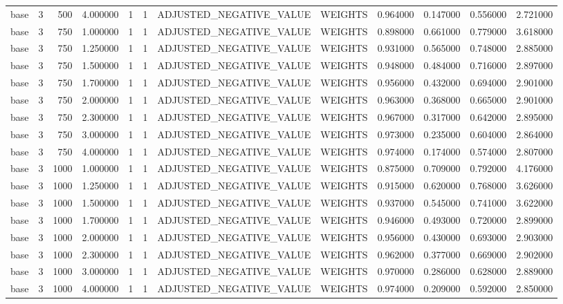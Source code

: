 \begin{tabular}{lrrrllllrrrr}
base & 3 & 500 & 4.000000 & 1 & 1 & ADJUSTED_NEGATIVE_VALUE & WEIGHTS & 0.964000 & 0.147000 & 0.556000 & 2.721000 \\
base & 3 & 750 & 1.000000 & 1 & 1 & ADJUSTED_NEGATIVE_VALUE & WEIGHTS & 0.898000 & 0.661000 & 0.779000 & 3.618000 \\
base & 3 & 750 & 1.250000 & 1 & 1 & ADJUSTED_NEGATIVE_VALUE & WEIGHTS & 0.931000 & 0.565000 & 0.748000 & 2.885000 \\
base & 3 & 750 & 1.500000 & 1 & 1 & ADJUSTED_NEGATIVE_VALUE & WEIGHTS & 0.948000 & 0.484000 & 0.716000 & 2.897000 \\
base & 3 & 750 & 1.700000 & 1 & 1 & ADJUSTED_NEGATIVE_VALUE & WEIGHTS & 0.956000 & 0.432000 & 0.694000 & 2.901000 \\
base & 3 & 750 & 2.000000 & 1 & 1 & ADJUSTED_NEGATIVE_VALUE & WEIGHTS & 0.963000 & 0.368000 & 0.665000 & 2.901000 \\
base & 3 & 750 & 2.300000 & 1 & 1 & ADJUSTED_NEGATIVE_VALUE & WEIGHTS & 0.967000 & 0.317000 & 0.642000 & 2.895000 \\
base & 3 & 750 & 3.000000 & 1 & 1 & ADJUSTED_NEGATIVE_VALUE & WEIGHTS & 0.973000 & 0.235000 & 0.604000 & 2.864000 \\
base & 3 & 750 & 4.000000 & 1 & 1 & ADJUSTED_NEGATIVE_VALUE & WEIGHTS & 0.974000 & 0.174000 & 0.574000 & 2.807000 \\
base & 3 & 1000 & 1.000000 & 1 & 1 & ADJUSTED_NEGATIVE_VALUE & WEIGHTS & 0.875000 & 0.709000 & 0.792000 & 4.176000 \\
base & 3 & 1000 & 1.250000 & 1 & 1 & ADJUSTED_NEGATIVE_VALUE & WEIGHTS & 0.915000 & 0.620000 & 0.768000 & 3.626000 \\
base & 3 & 1000 & 1.500000 & 1 & 1 & ADJUSTED_NEGATIVE_VALUE & WEIGHTS & 0.937000 & 0.545000 & 0.741000 & 3.622000 \\
base & 3 & 1000 & 1.700000 & 1 & 1 & ADJUSTED_NEGATIVE_VALUE & WEIGHTS & 0.946000 & 0.493000 & 0.720000 & 2.899000 \\
base & 3 & 1000 & 2.000000 & 1 & 1 & ADJUSTED_NEGATIVE_VALUE & WEIGHTS & 0.956000 & 0.430000 & 0.693000 & 2.903000 \\
base & 3 & 1000 & 2.300000 & 1 & 1 & ADJUSTED_NEGATIVE_VALUE & WEIGHTS & 0.962000 & 0.377000 & 0.669000 & 2.902000 \\
base & 3 & 1000 & 3.000000 & 1 & 1 & ADJUSTED_NEGATIVE_VALUE & WEIGHTS & 0.970000 & 0.286000 & 0.628000 & 2.889000 \\
base & 3 & 1000 & 4.000000 & 1 & 1 & ADJUSTED_NEGATIVE_VALUE & WEIGHTS & 0.974000 & 0.209000 & 0.592000 & 2.850000 \\

\end{tabular}
